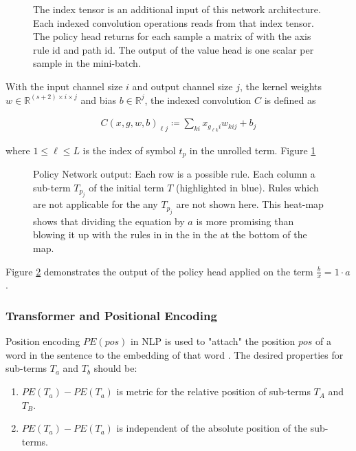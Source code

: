 \documentclass{scrartcl}
\theoremstyle{definition}
\begin{document}
\begin{figure}[!htbp]
	\centering
	
	\caption{The index tensor is an additional input of this network architecture.
		Each indexed convolution operations reads from that index tensor.
		The policy head returns for each sample a matrix of with the axis rule id and path id. 
		The output of the value head is one scalar per sample in the mini-batch. 
	}
	\label{fig:iconv_network}
\end{figure}

With the input channel size $i$ and output channel size $j$, the kernel weights $w \in \mathbb{R}^{\left( s+2 \right)\times i \times j}$ and bias $b \in \mathbb{R}^j$,
the indexed convolution $C$ is defined as

\begin{align}
	C\left( x, g, w, b \right)_{\ell j} \coloneqq \sum_{ki}x_{g_{\ell k}i} w_{kij}+b_j
\end{align}

where $1 \leq \ell \leq L$ is the index of symbol $t_p$ in the unrolled term. Figure \ref{fig:iconv_network}


\begin{figure}[!htbp]
	\centering
	
	\caption{Policy Network output: Each row is a possible rule. Each column a sub-term $T_{p_j}$ of the initial term $T$ (highlighted in blue).
	Rules which are not applicable for the any $T_{p_j}$ are not shown here.
	This heat-map shows that dividing the equation by $a$ is more promising than blowing it up with the rules in in the in the at the bottom of the map.}
	\label{fig:network_output}
\end{figure}

Figure \ref{fig:network_output} demonstrates the output of the policy head applied on the term $\frac{b}{x}=1\cdot a$ .

\subsubsection{Transformer and Positional Encoding}

Position encoding $PE\left( pos\right)$ in NLP is used to "attach" the position $pos$ of a word in the sentence to the embedding of that word \cite{vaswani2017attention}.
The desired properties for sub-terms $T_a$ and $T_b$ should be:
\begin{enumerate}[label=(\roman*)]
	\item $PE\left( T_a \right) - PE\left( T_a \right)$ is metric for the relative position of sub-terms $T_A$ and $T_B$.
	\item $PE\left( T_a \right) - PE\left( T_a \right)$ is independent of the absolute position of the sub-terms.
\end{enumerate}
\end{document}

